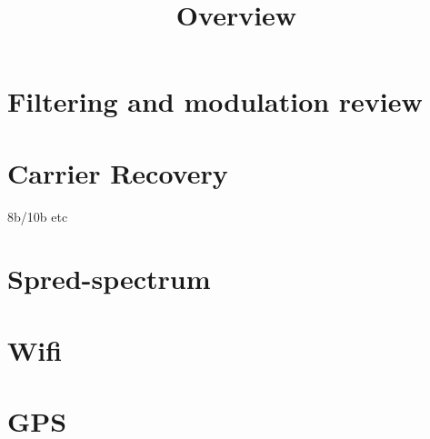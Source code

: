 

\title{Overview}

\maketitle


\section{Filtering and modulation review}

\section{Carrier Recovery}
8b/10b etc

\section{Spred-spectrum }

\section{Wifi}

\section{GPS}



